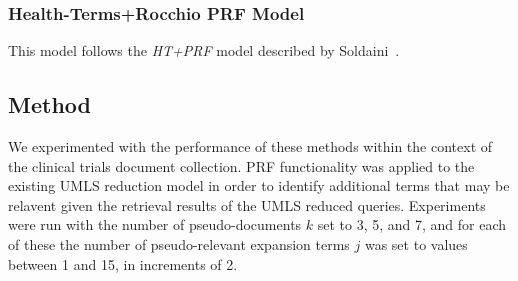 \documentclass[a4paper]{article}
\begin{document}
\subsubsection{Health-Terms+Rocchio PRF Model}
This model follows the \textit{HT+PRF} model described by Soldaini~\cite{}.

\subsection{Method}
We experimented with the performance of these methods within the context of the clinical trials document collection. PRF functionality was applied to the existing UMLS reduction model in order to identify additional terms that may be relavent given the retrieval results of the UMLS reduced queries. Experiments were run with the number of pseudo-documents $k$ set to 3, 5, and 7, and for each of these the number of pseudo-relevant expansion terms $j$ was set to values between 1 and 15, in increments of 2.



\end{document}
